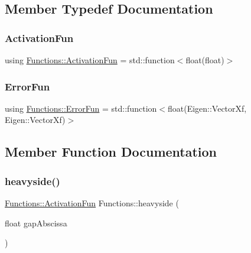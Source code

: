 \subsection{Member Typedef Documentation}
\mbox{\label{structFunctions_ad25362ffa52b2f7933431190546593ac}} 
\subsubsection{\texorpdfstring{Activation\+Fun}{ActivationFun}}
{\footnotesize\ttfamily using \hyperlink{structFunctions_ad25362ffa52b2f7933431190546593ac}{Functions\+::\+Activation\+Fun} =  std\+::function$<$float(float)$>$}

\mbox{\label{structFunctions_a834bc4170f1caa8c77272ecf51dbae5c}} 
\subsubsection{\texorpdfstring{Error\+Fun}{ErrorFun}}
{\footnotesize\ttfamily using \hyperlink{structFunctions_a834bc4170f1caa8c77272ecf51dbae5c}{Functions\+::\+Error\+Fun} =  std\+::function$<$float(Eigen\+::\+Vector\+Xf, Eigen\+::\+Vector\+Xf)$>$}



\subsection{Member Function Documentation}
\mbox{\label{structFunctions_a683c495693f3e2a5ec55e30edaccfd2d}} 
\subsubsection{\texorpdfstring{heavyside()}{heavyside()}}
{\footnotesize\ttfamily \hyperlink{structFunctions_ad25362ffa52b2f7933431190546593ac}{Functions\+::\+Activation\+Fun} Functions\+::heavyside (\begin{DoxyParamCaption}\item[{float}]{gap\+Abscissa }\end{DoxyParamCaption})\hspace{0.3cm}{\ttfamily [static]}}

